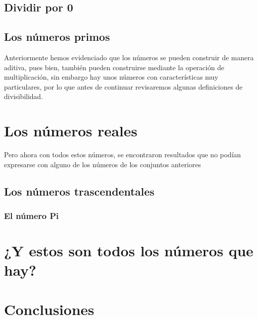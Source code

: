 \documentclass{article}
\begin{document}
\subsection{Dividir por 0}

\subsection{Los números primos} Anteriormente hemos evidenciado que los números se pueden construir de manera aditiva, pues bien, también pueden construirse mediante la operación de multiplicación, sin embargo hay unos números con características muy particulares, por lo que antes de continuar revisaremos algunas definiciones de divisibilidad.

\section{Los números reales}

Pero ahora con todos estos números, se encontraron resultados que no podían expresarse con alguno de los números de los conjuntos anteriores

\subsection{Los números trascendentales}

\subsubsection{El número Pi}

\section{¿Y estos son todos los números que hay?}

\section{Conclusiones}

\newpage

\nocite{*}


\end{document}
